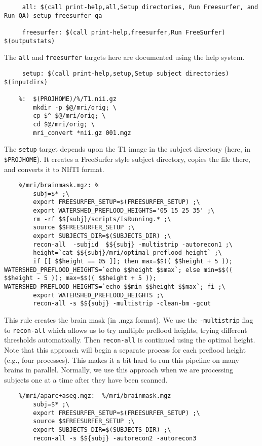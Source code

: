 \begin{lstlisting}
	 all: $(call print-help,all,Setup directories, Run Freesurfer, and Run QA) setup freesurfer qa

	 freesurfer: $(call print-help,freesurfer,Run FreeSurfer) $(outputstats)
\end{lstlisting}

The \texttt{all} and \texttt{freesurfer} targets here are documented
using the help system. 

\begin{lstlisting}
	 setup: $(call print-help,setup,Setup subject directories) $(inputdirs) 

	%:  $(PROJHOME)/%/T1.nii.gz 
		mkdir -p $@/mri/orig; \
		cp $^ $@/mri/orig; \
		cd $@/mri/orig; \
		mri_convert *nii.gz 001.mgz 
\end{lstlisting}

The \texttt{setup} target depends upon the T1 image in the subject
directory (here, in \texttt{\$PROJHOME}). It creates a FreeSurfer
style subject directory, copies the file there, and converts it to
NIfTI format. 


\begin{lstlisting}
	%/mri/brainmask.mgz: %
		subj=$* ;\
		export FREESURFER_SETUP=$(FREESURFER_SETUP) ;\
		export WATERSHED_PREFLOOD_HEIGHTS='05 15 25 35' ;\
		rm -rf $${subj}/scripts/IsRunning.* ;\
		source $$FREESURFER_SETUP ;\
		export SUBJECTS_DIR=$(SUBJECTS_DIR) ;\
		recon-all  -subjid  $${subj} -multistrip -autorecon1 ;\
		height=`cat $${subj}/mri/optimal_preflood_height` ;\
		if [[ $$height == 05 ]]; then max=$$(( $$height + 5 )); WATERSHED_PREFLOOD_HEIGHTS=`echo $$height $$max`; else min=$$(( $$height - 5 )); max=$$(( $$height + 5 )); WATERSHED_PREFLOOD_HEIGHTS=`echo $$min $$height $$max`; fi ;\
		export WATERSHED_PREFLOOD_HEIGHTS ;\
		recon-all -s $${subj} -multistrip -clean-bm -gcut
\end{lstlisting}

This rule creates the brain mask (in .mgz format). We use the
\texttt{-multistrip} flag to \texttt{recon-all} which allows us to try
multiple preflood heights, trying different thresholds
automatically. Then \texttt{recon-all} is continued using the optimal
height. Note that this approach will begin a separate process
for each preflood height (e.g., four processes). This makes it a bit
hard to run this pipeline on many brains in parallel. Normally, we use
this approach when we are processing subjects one at a time after they
have been scanned.

\begin{lstlisting}
	%/mri/aparc+aseg.mgz:  %/mri/brainmask.mgz 
		subj=$* ;\
		export FREESURFER_SETUP=$(FREESURFER_SETUP) ;\
		source $$FREESURFER_SETUP ;\
		export SUBJECTS_DIR=$(SUBJECTS_DIR) ;\
		recon-all -s $${subj} -autorecon2 -autorecon3 
\end{lstlisting}

